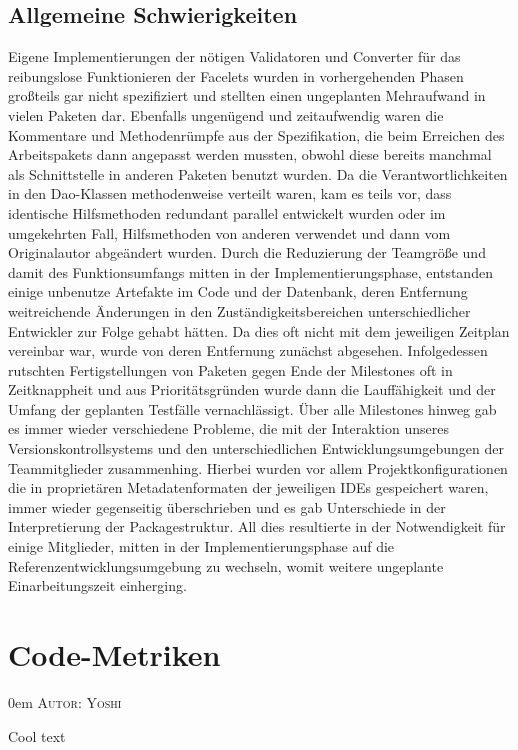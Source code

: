 \documentclass{article}
\makeatletter
\newcommand{\sectionauthor}[1]{
	{\parindent 0em \large \scshape Autor: #1 \par \nobreak \vspace*{1em}}
	\@afterheading
}
\makeatother
\begin{document}
\subsection{Allgemeine Schwierigkeiten}
Eigene Implementierungen der nötigen Validatoren und Converter für das reibungslose Funktionieren der Facelets wurden in vorhergehenden Phasen großteils gar nicht spezifiziert und stellten einen ungeplanten Mehraufwand in vielen Paketen dar. Ebenfalls ungenügend und zeitaufwendig waren die Kommentare und Methodenrümpfe aus der Spezifikation, die beim Erreichen des Arbeitspakets dann angepasst werden mussten, obwohl diese bereits manchmal als Schnittstelle in anderen Paketen benutzt wurden. Da die Verantwortlichkeiten in den Dao-Klassen methodenweise verteilt waren, kam es teils vor, dass identische Hilfsmethoden redundant parallel entwickelt wurden oder im umgekehrten Fall, Hilfsmethoden von anderen verwendet und dann vom Originalautor abgeändert wurden. Durch die Reduzierung der Teamgröße und damit des Funktionsumfangs mitten in der Implementierungsphase, entstanden einige unbenutze Artefakte im Code und der Datenbank, deren Entfernung weitreichende Änderungen in den Zuständigkeitsbereichen unterschiedlicher Entwickler zur Folge gehabt hätten. Da dies oft nicht mit dem jeweiligen Zeitplan vereinbar war, wurde von deren Entfernung zunächst abgesehen. Infolgedessen rutschten Fertigstellungen von Paketen gegen Ende der Milestones oft in Zeitknappheit und aus Prioritätsgründen wurde dann die Lauffähigkeit und der Umfang der geplanten Testfälle vernachlässigt. Über alle Milestones hinweg gab es immer wieder verschiedene Probleme, die mit der Interaktion unseres Versionskontrollsystems und den unterschiedlichen Entwicklungsumgebungen der Teammitglieder zusammenhing. Hierbei wurden vor allem Projektkonfigurationen die in proprietären Metadatenformaten der jeweiligen IDEs gespeichert waren, immer wieder gegenseitig überschrieben und es gab Unterschiede in der Interpretierung der Packagestruktur. All dies resultierte in der Notwendigkeit für einige Mitglieder, mitten in der Implementierungsphase auf die Referenzentwicklungsumgebung zu wechseln, womit weitere ungeplante Einarbeitungszeit einherging.

\section{Code-Metriken}
\sectionauthor{Yoshi}
Cool text
\end{document}
